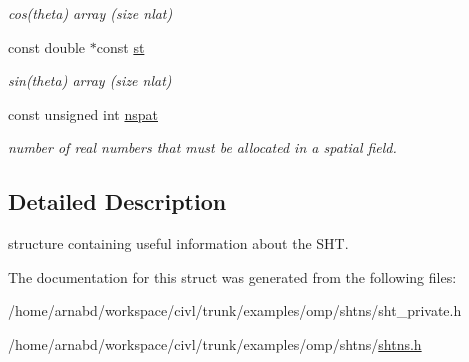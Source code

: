 \begin{DoxyCompactItemize}
\begin{DoxyCompactList}\small\item\em cos(theta) array (size nlat) \end{DoxyCompactList}\item 
\hypertarget{structshtns__info_a1dac28463059674fd24d1df5b05d6600}{}const double $\ast$const \hyperlink{structshtns__info_a1dac28463059674fd24d1df5b05d6600}{st}\label{structshtns__info_a1dac28463059674fd24d1df5b05d6600}

\begin{DoxyCompactList}\small\item\em sin(theta) array (size nlat) \end{DoxyCompactList}\item 
\hypertarget{structshtns__info_ad3fea3c5794ec7bf3825af15c1135223}{}const unsigned int \hyperlink{structshtns__info_ad3fea3c5794ec7bf3825af15c1135223}{nspat}\label{structshtns__info_ad3fea3c5794ec7bf3825af15c1135223}

\begin{DoxyCompactList}\small\item\em number of real numbers that must be allocated in a spatial field. \end{DoxyCompactList}\end{DoxyCompactItemize}


\subsection{Detailed Description}
structure containing useful information about the S\+H\+T. 

The documentation for this struct was generated from the following files\+:\begin{DoxyCompactItemize}
\item 
/home/arnabd/workspace/civl/trunk/examples/omp/shtns/sht\+\_\+private.\+h\item 
/home/arnabd/workspace/civl/trunk/examples/omp/shtns/\hyperlink{shtns_8h}{shtns.\+h}\end{DoxyCompactItemize}
